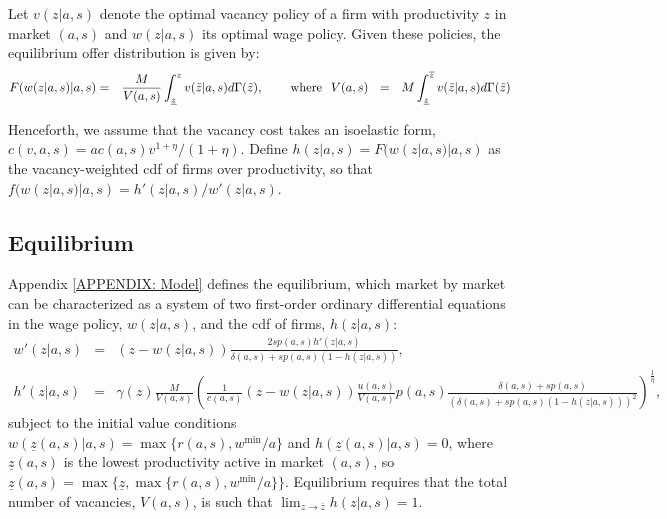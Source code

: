 Let $v(z|a,s)$ denote the optimal vacancy policy of a firm with productivity $z$ in market $(a,s)$ and $w(z|a,s)$ its optimal wage policy. Given these policies, the equilibrium offer distribution is given by:
%
\begin{eqnarray*}
  F(w(z|a,s)|a,s) &=& \frac{M}{V(a,s)} \int_{\underline{z}}^z v(\tilde{z}|a,s)d\Gamma(\tilde{z}), \hspace{.3in} \text{where} \hspace{.1in} V(a,s) \ \ = \ \ M \int_{\underline{z}}^{\overline{z}} v(\tilde{z}|a,s)d\Gamma(\tilde{z})
\end{eqnarray*}
%

Henceforth, we assume that the vacancy cost takes an isoelastic form, $c(v,a,s)=ac(a,s)v^{1+\eta}/(1+\eta)$. Define $h(z|a,s)=F(w(z|a,s)|a,s)$ as the vacancy-weighted cdf of firms over productivity, so that $f(w(z|a,s)|a,s)= h'(z|a,s) / w'(z|a,s)$.




\subsection{Equilibrium}

Appendix \ref{APPENDIX: Model} defines the equilibrium, which market by market can be characterized as a system of two first-order ordinary differential equations in the wage policy, $w(z|a,s)$, and the cdf of firms, $h(z|a,s)$:
%
\begin{eqnarray}
  \label{eq: differential equation system}
  w'(z|a,s) &=& \left(z-w(z|a,s)\right) \frac{2 s p(a,s) h'(z|a,s)}{\delta(a,s)+s p(a,s)\left(1-h(z|a,s)\right)}, \\
  h'(z|a,s) &=& \gamma(z) \frac{M}{V(a,s)} \left(\frac{1}{c(a,s)}\left(z-w(z|a,s)\right) \frac{u(a,s)}{V(a,s)} p(a,s) \frac{\delta(a,s) + sp(a,s)}{\left(\delta(a,s)+sp(a,s)(1-h(z|a,s))\right)^2}\right)^{\frac{1}{\eta}}, \nonumber
\end{eqnarray}
%
subject to the initial value conditions $w(\underline{z}(a,s)|a,s)=\max\{ r(a,s), w^{\text{min}}/a \}$ and $h(\underline{z}(a,s)|a,s)=0$, where $\underline{z}(a,s)$ is the lowest productivity active in market $(a,s)$, so $\underline{z}(a,s)=\max \{\underline{z},\max\{r(a,s), w^{\text{min}}/a \} \}$. Equilibrium requires that the total number of vacancies, $V(a,s)$, is such that $\lim_{z\to\overline{z}} h(z|a,s) = 1$.
